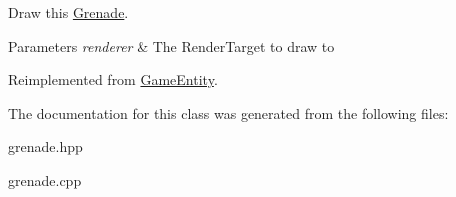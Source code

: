 Draw this \mbox{\hyperlink{class_grenade}{Grenade}}. 


\begin{DoxyParams}{Parameters}
{\em renderer} & The Render\+Target to draw to \\
\hline
\end{DoxyParams}


Reimplemented from \mbox{\hyperlink{class_game_entity_ae8417c4fa668594827706c44091f7366}{Game\+Entity}}.



The documentation for this class was generated from the following files\+:\begin{DoxyCompactItemize}
\item 
grenade.\+hpp\item 
grenade.\+cpp\end{DoxyCompactItemize}
